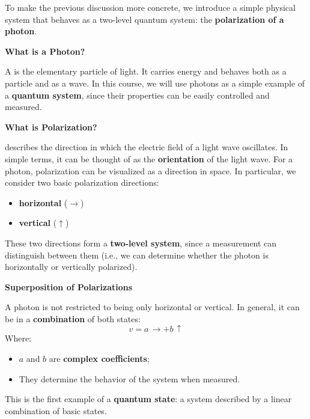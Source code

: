 \begin{examplebox}\label{ex:polarization}
    To make the previous discussion more concrete, we introduce a simple physical system that behaves as a two-level quantum system: the \textbf{polarization of a photon}.

    \highspace
    \begin{flushleft}
        \textcolor{Green3}{ \textbf{What is a Photon?}}
    \end{flushleft}
    A  is the elementary particle of light. It carries energy and behaves both as a particle and as a wave. In this course, we will use photons as a simple example of a \textbf{quantum system}, since their properties can be easily controlled and measured.

    \highspace
    \begin{flushleft}
        \textcolor{Green3}{ \textbf{What is Polarization?}}
    \end{flushleft}
     describes the direction in which the electric field of a light wave oscillates. In simple terms, it can be thought of as the \textbf{orientation} of the light wave. For a photon, polarization can be visualized as a direction in space. In particular, we consider two basic polarization directions:
    \begin{itemize}
        \item \textbf{horizontal} ($\rightarrow$)
        \item \textbf{vertical} ($\uparrow$)
    \end{itemize}
    These two directions form a \textbf{two-level system}, since a measurement can distinguish between them (i.e., we can determine whether the photon is horizontally or vertically polarized).

    \highspace
    \begin{flushleft}
        \textcolor{Green3}{ \textbf{Superposition of Polarizations}}
    \end{flushleft}
    A photon is not restricted to being only horizontal or vertical. In general, it can be in a \textbf{combination} of both states:
    \begin{equation*}
        v = a \, \rightarrow + b \, \uparrow
    \end{equation*}
    Where:
    \begin{itemize}
        \item $a$ and $b$ are \textbf{complex coefficients};
        \item They determine the behavior of the system when measured.
    \end{itemize}
    This is the first example of a \textbf{quantum state}: a system described by a linear combination of basic states.


\end{examplebox}
